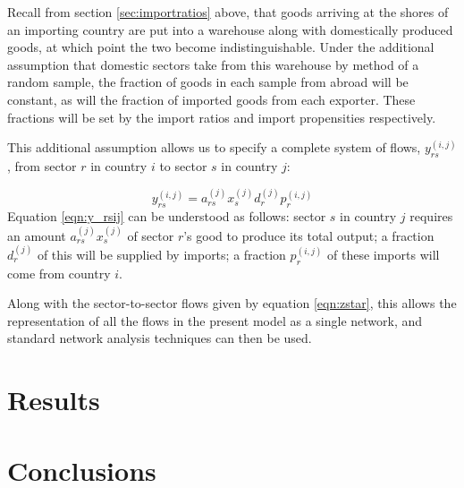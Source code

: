 \documentclass[a4paper]{article}
\begin{document}
Recall from section \ref{sec:importratios} above, that goods arriving at the shores of an importing country are put into a warehouse along with domestically produced goods, at which point the two become indistinguishable.
Under the additional assumption that domestic sectors take from this warehouse by method of a random sample, the fraction of goods in each sample from abroad will be constant, as will the fraction of imported goods from each exporter.
These fractions will be set by the import ratios and import propensities respectively.

This additional assumption allows us to specify a complete system of flows, $y_{rs}^{(i,j)}$, from sector $r$ in country $i$ to sector $s$ in country $j$:

\begin{equation}\label{eqn:y_rsij}
y_{rs}^{(i,j)} = a_{rs}^{(j)} x_{s}^{(j)} d_{r}^{(j)} p_{r}^{(i,j)} 
\end{equation}
Equation \eqref{eqn:y_rsij} can be understood as follows:
sector $s$ in country $j$ requires an amount $a_{rs}^{(j)} x_{s}^{(j)}$ of sector $r$'s good to produce its total output;
a fraction $d_{r}^{(j)}$ of this will be supplied by imports;
a fraction $p_{r}^{(i,j)}$ of these imports will come from country $i$.

Along with the sector-to-sector flows given by equation \eqref{eqn:zstar}, this allows the representation of all the flows in the present model as a single network, and standard network analysis techniques can then be used.

\section{Results}\label{sec:results}

\section{Conclusions}\label{sec:conclusions}

\printbibliography
\end{document}
